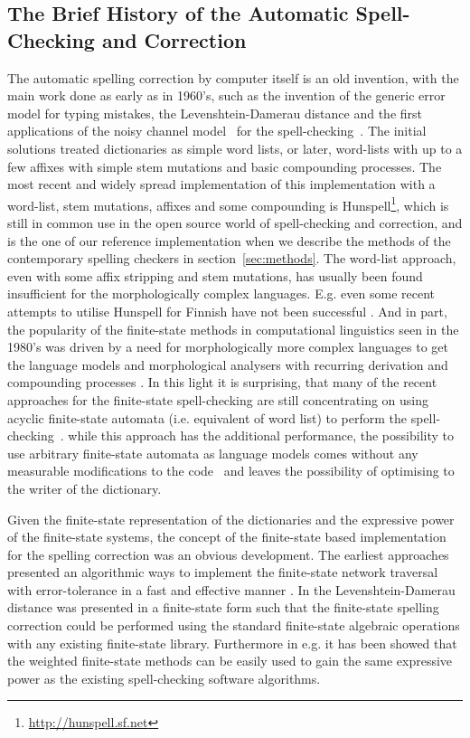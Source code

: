 \documentclass[a4paper,12pt]{article}
\begin{document}
\subsection{The Brief History of the Automatic Spell-Checking and Correction}
\label{subsec:background}

The automatic spelling correction by computer itself is an old invention, with
the main work done as early as in 1960's, such as the invention of the generic
error model for typing mistakes, the Levenshtein-Damerau distance
\cite[]{levenshtein/1966,damerau/1964} and the first applications of the noisy
channel model~\cite[]{shannon/1948} for the spell-checking~\cite[]{raviv/1967}.
The initial solutions treated dictionaries as simple word lists, or later,
word-lists with up to a few affixes with simple stem mutations and basic
compounding processes. The most recent and widely spread implementation of this
implementation with a word-list, stem mutations, affixes and some compounding
is Hunspell\footnote{\url{http://hunspell.sf.net}}, which is still in common
use in the open source world of spell-checking and correction, and is the one
of our reference implementation when we describe the methods of the
contemporary spelling checkers in section~\ref{sec:methods}. The word-list
approach, even with some affix stripping and stem mutations, has usually been
found insufficient for the morphologically complex languages.  E.g. even some
recent attempts to utilise Hunspell for Finnish have not been successful
\cite[]{pitkanen/2006}. And in part, the popularity of the finite-state methods
in computational linguistics seen in the 1980's was driven by a need for
morphologically more complex languages to get the language models and
morphological analysers with recurring derivation and compounding processes
\cite[]{beesley2004morphological}.  In this light it is surprising, that many
of the recent approaches for the finite-state spell-checking are still
concentrating on using acyclic finite-state automata (i.e. equivalent of word
list) to perform the
spell-checking~\cite[]{watson2003new,deorowicz2005correcting}. while this
approach has the additional performance, the possibility to use arbitrary
finite-state automata as language models comes without any measurable
modifications to the code~\cite[e.g.][]{pirinen/2010/lrec} and leaves the
possibility of optimising to the writer of the dictionary.

Given the  finite-state representation of the dictionaries and the expressive
power of the finite-state systems, the concept of the finite-state based
implementation for the spelling correction was an obvious development. The
earliest approaches presented an algorithmic ways to implement the finite-state
network traversal with error-tolerance \cite[]{oflazer/1996} in a fast and
effective manner \cite[]{agata/2002,hulden/2009}.  In \cite{schulz/2002} the
Levenshtein-Damerau distance was presented in a finite-state form such that the
finite-state spelling correction could be performed using the standard
finite-state algebraic operations with any existing finite-state library.
Furthermore in e.g.  \cite{pirinen/2010/lrec} it has been showed that the
weighted finite-state methods can be easily used to gain the same expressive
power as the existing spell-checking software algorithms.
\end{document}
